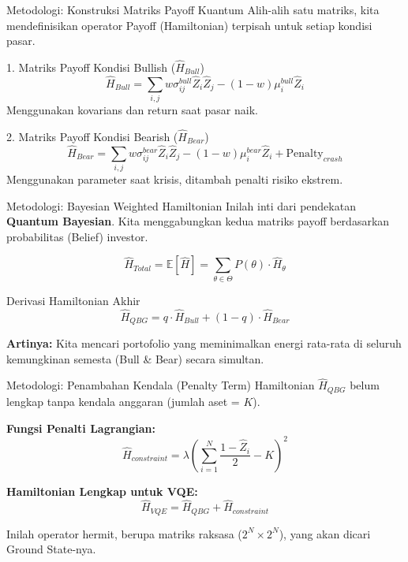 \documentclass{beamer}
\begin{document}
\begin{frame}{Metodologi: Konstruksi Matriks Payoff Kuantum}
    Alih-alih satu matriks, kita mendefinisikan operator Payoff (Hamiltonian) terpisah untuk setiap kondisi pasar.
    
    \begin{block}{1. Matriks Payoff Kondisi Bullish ($\hat{H}_{Bull}$)}
    $$ \hat{H}_{Bull} = \sum_{i,j} w \sigma_{ij}^{bull} \hat{Z}_i \hat{Z}_j - (1-w) \mu_i^{bull} \hat{Z}_i $$
    \footnotesize{Menggunakan kovarians dan return saat pasar naik.}
    \end{block}
    
    \begin{block}{2. Matriks Payoff Kondisi Bearish ($\hat{H}_{Bear}$)}
    $$ \hat{H}_{Bear} = \sum_{i,j} w \sigma_{ij}^{bear} \hat{Z}_i \hat{Z}_j - (1-w) \mu_i^{bear} \hat{Z}_i + \text{Penalty}_{crash} $$
    \footnotesize{Menggunakan parameter saat krisis, ditambah penalti risiko ekstrem.}
    \end{block}
\end{frame}

\begin{frame}{Metodologi: Bayesian Weighted Hamiltonian}
    Inilah inti dari pendekatan \textbf{Quantum Bayesian}. Kita menggabungkan kedua matriks payoff berdasarkan probabilitas (Belief) investor.
    
    $$ \hat{H}_{Total} = \mathbb{E}[\hat{H}] = \sum_{\theta \in \Theta} P(\theta) \cdot \hat{H}_{\theta} $$
    
    \begin{alertblock}{Derivasi Hamiltonian Akhir}
    \Large
    $$ \hat{H}_{QBG} = q \cdot \hat{H}_{Bull} + (1-q) \cdot \hat{H}_{Bear} $$
    \end{alertblock}
    
    \vspace{0.2cm}
    \textbf{Artinya:} Kita mencari portofolio yang meminimalkan energi rata-rata di seluruh kemungkinan semesta (Bull & Bear) secara simultan.
\end{frame}

\begin{frame}{Metodologi: Penambahan Kendala (Penalty Term)}
    Hamiltonian $\hat{H}_{QBG}$ belum lengkap tanpa kendala anggaran (jumlah aset = $K$).
    
    \textbf{Fungsi Penalti Lagrangian:}
    $$ \hat{H}_{constraint} = \lambda \left( \sum_{i=1}^N \frac{1-\hat{Z}_i}{2} - K \right)^2 $$
    
    \textbf{Hamiltonian Lengkap untuk VQE:}
    $$ \hat{H}_{VQE} = \hat{H}_{QBG} + \hat{H}_{constraint} $$
    
    Inilah operator hermit, berupa matriks raksasa ($2^N \times 2^N$), yang akan dicari Ground State-nya.
\end{frame}
\end{document}
